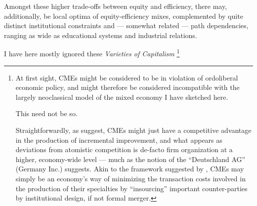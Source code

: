 \begin{enumerate}
	Amongst these higher trade-offs between equity and efficiency, there may, additionally, be local optima of equity-efficiency mixes, complemented by quite distinct institutional constraints and --- somewhat related --- path dependencies, ranging as wide as educational systems and industrial relations.

	I have here mostly ignored these \emph{Varieties of Capitalism} \citep{HallSoskice-2001-aa}
	\footnote{
		At first sight, \glspl{CME} might be considered to be in violation of ordoliberal economic policy, and might therefore be considered incompatible with the largely neoclassical model of the mixed economy I have sketched here.

		This need not be so.

		Straightforwardly, as \citeauthor{HallSoskice-2001-aa} suggest, \glspl{CME} might just have a competitive advantage in the production of incremental improvement, and what appears as deviations from atomistic competition is de-facto firm organization at a higher, economy-wide level --- much as the notion of the ``Deutschland AG'' (Germany Inc.) suggests.
		Akin to the framework suggested by \cite{Hart1990}, \glspl{CME} may simply be an economy's way of minimizing the transaction costs involved in the production of their specialties by ``insourcing'' important counter-parties by institutional design, if not formal merger.

}
\end{enumerate}
